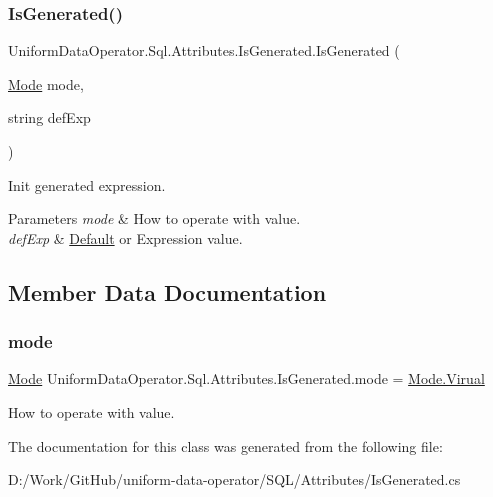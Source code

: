 \subsubsection{\texorpdfstring{Is\+Generated()}{IsGenerated()}}
{\footnotesize\ttfamily Uniform\+Data\+Operator.\+Sql.\+Attributes.\+Is\+Generated.\+Is\+Generated (\begin{DoxyParamCaption}\item[{\mbox{\hyperlink{class_uniform_data_operator_1_1_sql_1_1_attributes_1_1_is_generated_aa8286a355a1ac86ccd56cf5b44f5ed59}{Mode}}}]{mode,  }\item[{string}]{def\+Exp }\end{DoxyParamCaption})}



Init generated expression. 


\begin{DoxyParams}{Parameters}
{\em mode} & How to operate with value.\\
\hline
{\em def\+Exp} & \mbox{\hyperlink{class_uniform_data_operator_1_1_sql_1_1_attributes_1_1_default}{Default}} or Expression value.\\
\hline
\end{DoxyParams}


\subsection{Member Data Documentation}
\mbox{\label{class_uniform_data_operator_1_1_sql_1_1_attributes_1_1_is_generated_a9721250897ee9813cccc2aaa17ec8983}} 
\subsubsection{\texorpdfstring{mode}{mode}}
{\footnotesize\ttfamily \mbox{\hyperlink{class_uniform_data_operator_1_1_sql_1_1_attributes_1_1_is_generated_aa8286a355a1ac86ccd56cf5b44f5ed59}{Mode}} Uniform\+Data\+Operator.\+Sql.\+Attributes.\+Is\+Generated.\+mode = \mbox{\hyperlink{class_uniform_data_operator_1_1_sql_1_1_attributes_1_1_is_generated_aa8286a355a1ac86ccd56cf5b44f5ed59aa6d194ab7efe0417c28a02b8a8997bd0}{Mode.\+Virual}}}



How to operate with value. 



The documentation for this class was generated from the following file\+:\begin{DoxyCompactItemize}
\item 
D\+:/\+Work/\+Git\+Hub/uniform-\/data-\/operator/\+S\+Q\+L/\+Attributes/Is\+Generated.\+cs\end{DoxyCompactItemize}

